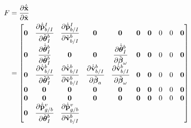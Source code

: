 \begin{align}
  F &= \frac{ \partial \dot{\tilde{\boldsymbol{\mathrm{x}}}} }{ \partial \tilde{\boldsymbol{\mathrm{x}}} } \\
    &=
    \begin{bmatrix}
      \boldsymbol{\mathrm{0}} &
    \cfrac{ \partial \dot{\tilde{\boldsymbol{\mathrm{p}}}}_{b/I}^{I}}{ \partial \tilde{\boldsymbol{\mathrm{\theta}}}_I^{b}}
               &
               \cfrac{ \partial \dot{\tilde{\boldsymbol{\mathrm{p}}}}_{b/I}^{I} }{ \partial \tilde{\boldsymbol{\mathrm{v}}}_{b/I}^b }
               &
      \boldsymbol{\mathrm{0}} & \boldsymbol{\mathrm{0}} & \boldsymbol{\mathrm{0}} & \boldsymbol{\mathrm{0}}
               & 0 & 0 & \boldsymbol{\mathrm{0}} \\
      \boldsymbol{\mathrm{0}} &
      \cfrac{ \partial \dot{\tilde{\boldsymbol{\mathrm{\theta}}}}_I^{b} }{ \partial \tilde{\boldsymbol{\mathrm{\theta}}}_I^{b} }
               & \boldsymbol{\mathrm{0}} & \boldsymbol{\mathrm{0}} &
      \cfrac{ \partial \dot{\tilde{\boldsymbol{\mathrm{\theta}}}}_I^{b} }{ \partial \tilde{\boldsymbol{\mathrm{\beta}}}_{\omega} }
               & \boldsymbol{\mathrm{0}} & \boldsymbol{\mathrm{0}}
               & 0 & 0 & \boldsymbol{\mathrm{0}} \\
      \boldsymbol{\mathrm{0}} &
      \cfrac{ \partial \dot{\tilde{\boldsymbol{\mathrm{v}}}}_{b/I}^b }{ \partial \tilde{\boldsymbol{\mathrm{\theta}}}_I^{b} }
               &
      \cfrac{ \partial \dot{\tilde{\boldsymbol{\mathrm{v}}}}_{b/I}^b }{ \partial \tilde{\boldsymbol{\mathrm{v}}}_{b/I}^b }
               &
      \cfrac{ \partial \dot{\tilde{\boldsymbol{\mathrm{v}}}}_{b/I}^b }{ \partial \tilde{\boldsymbol{\mathrm{\beta}}}_a }
               &
      \cfrac{ \partial \dot{\tilde{\boldsymbol{\mathrm{v}}}}_{b/I}^b }{ \partial \tilde{\boldsymbol{\mathrm{\beta}}}_{\omega} }
               & \boldsymbol{\mathrm{0}} & \boldsymbol{\mathrm{0}}
               & 0 & 0 & \boldsymbol{\mathrm{0}} \\
      \boldsymbol{\mathrm{0}} & \boldsymbol{\mathrm{0}} & \boldsymbol{\mathrm{0}} & \boldsymbol{\mathrm{0}} & \boldsymbol{\mathrm{0}} & \boldsymbol{\mathrm{0}} & \boldsymbol{\mathrm{0}}
               & 0 & 0 & \boldsymbol{\mathrm{0}} \\
      \boldsymbol{\mathrm{0}} & \boldsymbol{\mathrm{0}} & \boldsymbol{\mathrm{0}} & \boldsymbol{\mathrm{0}} & \boldsymbol{\mathrm{0}} & \boldsymbol{\mathrm{0}} & \boldsymbol{\mathrm{0}}
               & 0 & 0 & \boldsymbol{\mathrm{0}} \\
      \boldsymbol{\mathrm{0}} &
      \cfrac{ \partial \dot{\tilde{\boldsymbol{\mathrm{p}}}}_{g/b}^{v} }{ \partial \tilde{\boldsymbol{\mathrm{\theta}}}_I^{b} }
               & 
      \cfrac{ \partial \dot{\tilde{\boldsymbol{\mathrm{p}}}}_{g/b}^{v} }{ \partial \tilde{\boldsymbol{\mathrm{v}}}_{b/I}^b }

\end{bmatrix}
\end{align}
